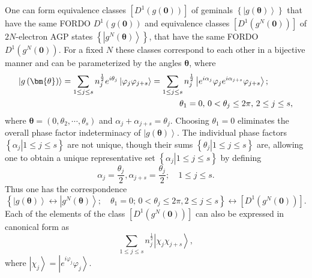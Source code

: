 \documentclass{preprint}
\begin{document}
One can form equivalence classes $\left[ D^{1}\left( g\left( \bm{0}\right)
\right) \right] $ of geminals $\left\{ \left\vert g\left( \bm{\theta}\right)
\right\rangle \right\} $ that have the same FORDO $D^{1}\left( g\left( \bm{0}%
\right) \right) $ and equivalence classes $\left[ D^{1}\left( g^{N}\left( %
\bm{0}\right) \right) \right] $ of $2N$-electron AGP states $\left\{
\left\vert g^{N}\left( \bm{\theta }\right) \right\rangle \right\} $, that
have the same FORDO $D^{1}\left( g^{N}\left( \bm{0}\right) \right) $. For a
fixed $N$ these classes correspond to each other in a bijective manner \cite%
{Yukalov00} and can be parameterized by the angles $\bm{\theta}$, where
\begin{align}
\left\vert g\left( \bm{\theta}\right) \right\rangle & =\sum_{1\leq j\leq
s}n_{j}^{\frac{1}{2}}e^{i\theta_{j}}\left\vert \varphi_{j}\varphi
_{j+s}\right\rangle =\sum_{1\leq j\leq s}n_{j}^{\frac{1}{2}}\left\vert
e^{i\alpha_{j}}\varphi_{j}e^{i\alpha_{j+s}}\varphi_{j+s}\right\rangle ;
\notag \\
&
\qquad\qquad\qquad\qquad\qquad\qquad\qquad\theta_{1}=0,\,0<\theta_{j}\leq2%
\pi,\,2\leq j\leq s,
\end{align}
where $\bm{\theta=}\left( 0,\theta_{2},\cdots,\theta_{s}\right) $ and $%
\alpha_{j}+\alpha_{j+s}=\theta_{j}$. Choosing $\theta_{1}=0$ eliminates the
overall phase factor indeterminacy of $\left\vert g\left( \bm{\theta }%
\right) \right\rangle $. The individual phase factors $\left\{ \left.
\alpha_{j}\right\vert 1\leq j\leq s\right\} $ are not unique, though their
sums $\left\{ \left. \theta_{j}\right\vert 1\leq j\leq s\right\} $ are,
allowing one to obtain a unique representative set $\left\{ \left.
\alpha_{j}\right\vert 1\leq j\leq s\right\} $ by defining
\begin{equation}
\alpha_{j}=\frac{\theta_{j}}{2},\alpha_{j+s}=\frac{\theta_{j}}{2};\quad1\leq
j\leq s.
\end{equation}
Thus one has the correspondence
\begin{equation}
\left\{ \left\vert g\left( \bm{\theta}\right) \right\rangle
\longleftrightarrow\left\vert g^{N}\left( \bm{\theta}\right) \right\rangle
;\quad\theta_{1}=0;\,0<\theta_{j}\leq2\pi,2\leq j\leq s\right\}
\longleftrightarrow\left[ D^{1}\left( g^{N}\left( \bm{0}\right) \right) %
\right] .
\end{equation}
Each of the elements of the class $\left[ D^{1}\left( g^{N}\left( \bm{0}%
\right) \right) \right] $ can also be expressed in canonical form as
\begin{equation}
\sum_{1\leq j\leq s}n_{j}^{\frac{1}{2}}\left\vert
\chi_{j}\chi_{j+s}\right\rangle ,
\end{equation}
where $\left\vert \chi_{j}\right\rangle =\left\vert
e^{i\varphi_{j}}\varphi_{j}\right\rangle $.
\end{document}
